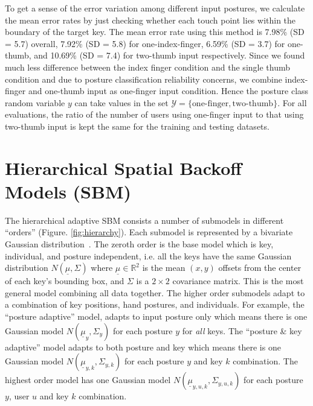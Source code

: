 \documentclass{sigchi}
\begin{document}
To get a sense of the error variation among different input postures, we
calculate the mean error rates by just checking whether each touch point lies within the
boundary of the target key. The mean error rate using this method is
7.98\% (SD = 5.7) overall, 7.92\% (SD = 5.8) for one-index-finger, 6.59\% (SD =
3.7) for one-thumb, and 10.69\% (SD = 7.4) for two-thumb input respectively.
Since we found much less difference between the index finger condition and the single thumb condition and due to posture classification reliability concerns, we combine index-finger and one-thumb input as one-finger input condition. Hence the posture class random variable $y$ can take values in the set $\mathcal{Y} = \{\text{one-finger}, \text{two-thumb}\}$.
For all evaluations, the ratio of the number of users using one-finger input to 
that using two-thumb input is kept the same for the training and testing datasets.

\section{Hierarchical Spatial Backoff Models (SBM)}
The hierarchical adaptive SBM consists a number of submodels in different “orders” (Figure. \ref{fig:hierarchy}). Each submodel is represented by a bivariate Gaussian distribution~\cite{Azenkot:2012, Goodman:2002, Rashid:2008}.
The zeroth order is the base model which is key, individual, and posture
independent, i.e. all the keys have the same Gaussian distribution $N(\underline\mu, \Sigma)$
where $\underline\mu \in \mathbb{R}^2$ is the mean $(x, y)$ offsets from the center of
each key's bounding box, and $\Sigma$ is a $2\times 2$ covariance matrix. This is the most general model combining all data together. The
higher order submodels adapt to a combination of 
key positions, hand postures, and individuals. For example, the ``posture adaptive'' model, adapts to input posture only which means there is one Gaussian model $N(\underline\mu_y, \Sigma_y)$ for each posture $y$ for \textit{all} keys. The ``posture \& key adaptive'' model adapts to both posture and key which means there is one Gaussian model $N(\underline\mu_{y, k}, \Sigma_{y, k})$ for each posture $y$ and key $k$ combination.  The highest order model has one Gaussian model $N(\underline\mu_{y,u,k}, \Sigma_{y,u,k})$ for each posture $y$, user $u$ and key $k$ combination.
\end{document}
